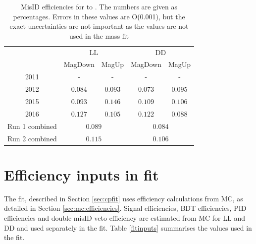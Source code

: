 \begin{table}[h]
\centering
\begin{tabular}{c|cc|cc}
\hline
& \multicolumn{2}{c}{LL} & \multicolumn{2}{c}{DD} \\
& MagDown & MagUp & MagDown & MagUp \\
\hline
2011 & - & - & - & - \\
2012 & $0.084$ & $0.093$ & $0.073$ & $0.095$ \\
2015 & $0.093$ & $0.146$ & $0.109$ & $0.106$ \\
2016 & $0.127$ & $0.105$ & $0.122$ & $0.088$ \\
\hline
Run 1 combined & \multicolumn{2}{c}{$0.089$} & \multicolumn{2}{c}{$0.084$} \\
Run 2 combined & \multicolumn{2}{c}{$0.115$} & \multicolumn{2}{c}{$0.106$} \\
\hline
\end{tabular}
\caption{MisID efficiencies for \decay{\Dz}{\Km\pip\pim\pip} to \decay{\Dz}{\Kp\pim\pip\pim}. The numbers are given as percentages. Errors in these values are O(0.001), but the exact uncertainties are not important as the values are not used in the mass fit}
\label{misideff4body}
\end{table}

\section{Efficiency inputs in \CP fit}

The \CP fit, described in Section \ref{sec:cpfit} uses efficiency calculations from MC, as detailed in Section \ref{sec:mc:efficiencies}. Signal efficiencies, BDT efficiencies, PID efficiencies and double misID veto efficiency are estimated from MC for LL and DD and used separately in the \CP fit. Table \ref{fitinputs} summarises the values used in the \CP fit. 

